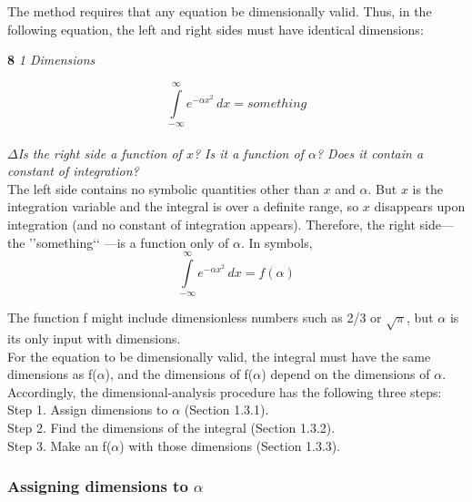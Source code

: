 \documentclass[a4paper]{article}
\numberwithin{equation}{section}
\begin{document}
The method requires that any equation be dimensionally valid. Thus,
in the following equation, the left and right sides must have identical
dimensions:

\newpage
 \large\textbf{8} \hfill \textit{1 Dimensions} \\ 
\vspace{0pt} 

\begin{equation}
\int\limits_{-\infty}^{\infty} e^{-\alpha x^2}\,dx=something
\end{equation}
\\

$\Delta$\textit {Is the right side a function of $x$? Is it a function of $\alpha$? Does it contain a constant
of integration?}
\\

The left side contains no symbolic quantities other than $x$ and $\alpha$. But
$x$ is the integration variable and the integral is over a definite range, so
$x$ disappears upon integration (and no constant of integration appears).
Therefore, the right side—the ’’something‘‘
—is a function only of $\alpha$. In
symbols,
\\

\begin{equation}
\int\limits_{-\infty}^{\infty} e^{-\alpha x^2}\,dx=f(\alpha)
\end{equation}

The function f might include dimensionless numbers such as 2/3 or $\sqrt{\pi}$,
but $\alpha$ is its only input with dimensions.
\\

For the equation to be dimensionally valid, the integral must have the
same dimensions as f($\alpha$), and the dimensions of f($\alpha$) depend on the
dimensions of $\alpha$. Accordingly, the dimensional-analysis procedure has
the following three steps:
\\

Step 1. Assign dimensions to $\alpha$ (Section 1.3.1).
\\

Step 2. Find the dimensions of the integral (Section 1.3.2).
\\

Step 3. Make an f($\alpha$) with those dimensions (Section 1.3.3).
\\

\subsubsection{Assigning dimensions to $\alpha$}
\end{document}
